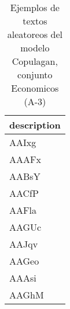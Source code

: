 \begin{table}[H]
\centering
\fontsize{8}{14}\selectfont
\caption{Ejemplos de textos aleatoreos del modelo Copulagan, conjunto Economicos (A-3)}
\label{table-sample10-economicos-a-3-copulagan-text}
\begin{tabular}{|m{50em}|}
\hline
\rowcolor[gray]{0.8}
description \\
\hline AAIxg \\
\hline AAAFx \\
\hline AABsY \\
\hline AACfP \\
\hline AAFla \\
\hline AAGUc \\
\hline AAJqv \\
\hline AAGeo \\
\hline AAAsi \\
\hline AAGhM \\
\hline
\end{tabular}
\end{table}
